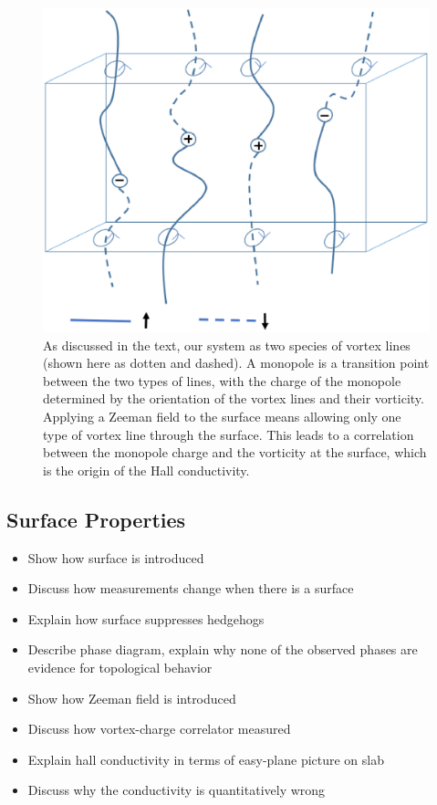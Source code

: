 \documentclass[prb,twocolumn]{revtex4}
\begin{document}
\begin{figure}
\includegraphics[angle=-90,width=0.5\linewidth]{figures/monopoles.eps}
\caption{As discussed in the text, our system as two species of vortex lines (shown here as dotten and dashed). A monopole is a transition point between the two types of lines, with the charge of the monopole determined by the orientation of the vortex lines and their vorticity. Applying a Zeeman field to the surface means allowing only one type of vortex line through the surface. This leads to a correlation between the monopole charge and the vorticity at the surface, which is the origin of the Hall conductivity.}
\label{monopole}
\end{figure}

\subsection{Surface Properties}
\begin{itemize}
\item Show how surface is introduced
\item Discuss how measurements change when there is a surface
\item Explain how surface suppresses hedgehogs
\item Describe phase diagram, explain why none of the observed phases are evidence for topological behavior
\item Show how Zeeman field is introduced
\item Discuss how vortex-charge correlator measured
\item Explain hall conductivity in terms of easy-plane picture on slab
\item Discuss why the conductivity is quantitatively wrong
\end{itemize}
\end{document}
